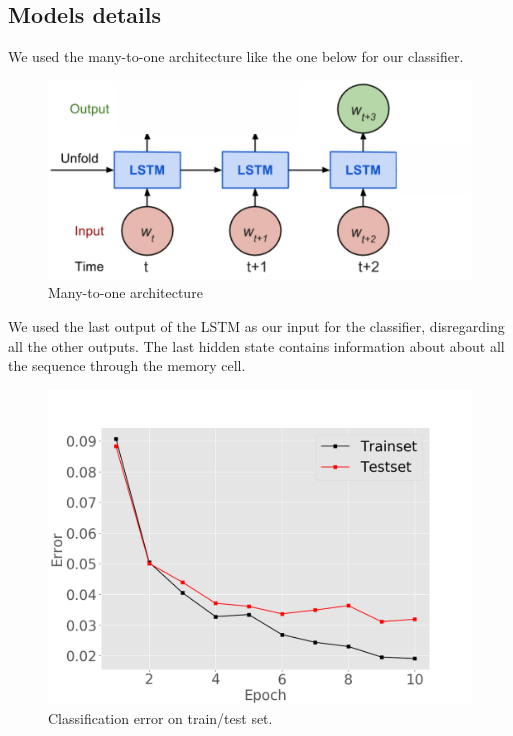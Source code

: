 
\subsection{Models details}

We used the many-to-one architecture like the one below for our 
classifier.
\begin{figure}[ht]
\vskip 0.2in
\begin{center}
\centerline{\includegraphics[width=\columnwidth]{manytoone}}
\caption{Many-to-one architecture}
\end{center}
\vskip -0.2in
\end{figure}
We used the last output of the LSTM as our input for the classifier, 
disregarding all the other outputs. The last hidden state contains 
information about about all the sequence through the memory cell. 

\begin{figure}[ht]
\vskip 0.2in
\begin{center}
\centerline{\includegraphics[width=\columnwidth]{classerror}}
\caption{Classification error on train/test set.}
\end{center}
\vskip -0.2in
\end{figure}

